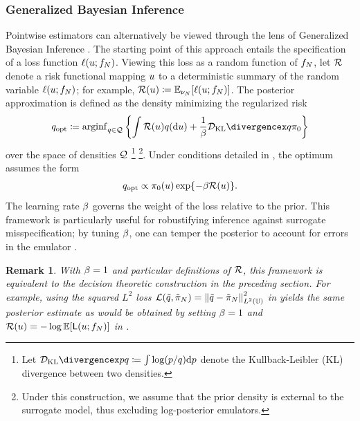 \documentclass[12pt]{article}
\newtheorem{remark}{Remark}
\begin{document}
\subsubsection{Generalized Bayesian Inference} \label{sec:generalized-bayes}
Pointwise estimators can alternatively be viewed through the lens of 
Generalized Bayesian Inference \citep{Bissiri2016,knoblauch2019}. The starting point of this approach 
entails the specification of a loss function $\ell(u; f_{N})$.
Viewing this loss as a random function of $f_{N}$, let $\mathcal{R}$ 
denote a risk functional mapping $u$ to a deterministic summary of the random variable $\ell(u; f_{N})$;
for example, $\mathcal{R}(u) \coloneqq \mathbb{E}_{\nu_{N}}[\ell(u; f_{N})]$.
The posterior approximation is defined as the density minimizing the regularized risk
\begin{align}
\qDensNormOpt \Def \mathrm{arginf}_{\qDensNorm \in \qSpaceNorm} 
\left\{\int \risk(\Par) \qDensNorm(\d\Par) + \frac{1}{\gibbsrate} \KL{\qDensNorm}{\priorDens} \right\}
\label{eq:gen-bayes-opt}
\end{align}
over the space of densities $\mathcal{Q}$
\footnote{Let $\KL{p}{q} \Def \int \log(p/q) \d p$ denote the Kullback-Leibler (KL) divergence between two densities.}
\footnote{Under this construction, we assume that the prior density is external to the surrogate model,
thus excluding log-posterior emulators.}.
Under conditions detailed in \citet{Bissiri2016}, the optimum 
assumes the form
\begin{align}
q_{\mathrm{opt}} \propto \pi_0(u) \exp\mathopen{}\left\{-\beta \mathcal{R}(u)\right\}\mathclose{}.
\end{align}
The learning rate $\beta$ governs the weight of the loss relative to the prior. This framework is particularly useful 
for robustifying inference against surrogate misspecification; by tuning $\beta$, one can temper the posterior to 
account for errors in the emulator \citep{Bissiri2016}. 

\begin{remark}
With $\beta = 1$ and particular definitions 
of $\mathcal{R}$, this framework is equivalent to the decision theoretic construction in the preceding section.
For example, using the squared $L^2$ loss $\mathcal{L}(\tilde{q}, {\tilde{\pi}}_{N}) = \left\lVert\tilde{q} - {\tilde{\pi}}_{N}\right\rVert^2_{L^2(\mathbb{U})}$
in  yields the same posterior estimate as would be obtained by setting
$\beta = 1$ and $\mathcal{R}(u) = -\log \mathbb{E}[\mathsf{L}(u; f_{N})]$ in .
\end{remark}
\end{document}
